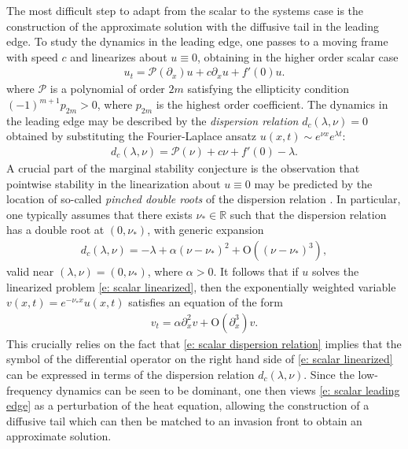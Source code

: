 \documentclass[11pt]{article}
\newcommand{\R}{\mathbb{R}}
\numberwithin{equation}{section}
\numberwithin{prop}{section}
\begin{document}
The most difficult step to adapt from the scalar to the systems case is the construction of the approximate solution with the diffusive tail in the leading edge. To study the dynamics in the leading edge, one passes to a moving frame with speed $c$ and linearizes about $u \equiv 0$, obtaining in the higher order scalar case
\begin{align}
u_t = \mathcal{P}(\partial_x)u + c \partial_x u + f'(0) u. \label{e: scalar linearized}
\end{align}
where $\mathcal{P}$ is a polynomial of order $2m$ satisfying the ellipticity condition $(-1)^{m+1} p_{2m} > 0$, where $p_{2m}$ is the highest order coefficient. The dynamics in the leading edge may be described by the \emph{dispersion relation} $d_c (\lambda, \nu) = 0$ obtained by substituting the Fourier-Laplace ansatz $u(x,t) \sim e^{\nu x} e^{\lambda t}$:
\begin{align}
d_c (\lambda, \nu) = \mathcal{P}(\nu) + c \nu + f'(0) - \lambda. \label{e: scalar dispersion relation}
\end{align}
 A crucial part of the marginal stability conjecture is the observation that pointwise stability in the linearization about $u \equiv 0$ may be predicted by the location of so-called \emph{pinched double roots} of the dispersion relation \cite{vanSaarloosReview, HolzerScheelPointwiseGrowth}. In particular, one typically assumes that there exists $\nu_* \in \R$ such that the dispersion relation has a double root at $(0, \nu_*)$, with generic expansion 
\begin{align}
	d_c (\lambda, \nu) = - \lambda + \alpha (\nu - \nu_*)^2 + \mathrm{O}\left((\nu-\nu_*)^3\right), \label{e: double root expansion}
\end{align}
valid near $(\lambda, \nu) = (0, \nu_*)$, where $\alpha > 0$. 
It follows that if $u$ solves the linearized problem \eqref{e: scalar linearized}, then the exponentially weighted variable $v(x,t) = e^{-\nu_* x} u(x,t)$ satisfies an equation of the form
\begin{align}
v_t = \alpha \partial_x^2 v + \mathrm{O}(\partial_x^3) v. \label{e: scalar leading edge}
\end{align}
This crucially relies on the fact that \eqref{e: scalar dispersion relation} implies that the symbol of the differential operator on the right hand side of \eqref{e: scalar linearized} can be expressed in terms of the dispersion relation $d_c (\lambda, \nu)$. Since the low-frequency dynamics can be seen to be dominant, one then views \eqref{e: scalar leading edge} as a perturbation of the heat equation, allowing the construction of a diffusive tail which can then be matched to an invasion front to obtain an approximate solution. 
\end{document}

